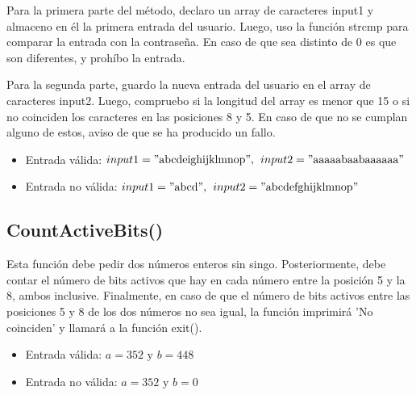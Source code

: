 \documentclass[11pt,a4paper]{article}
\begin{document}
Para la primera parte del método, declaro un array de caracteres input1 y almaceno en él la primera entrada del usuario. Luego, uso la función strcmp para comparar la entrada con la contraseña. En caso de que sea distinto de 0 es que son diferentes, y prohíbo la entrada.

Para la segunda parte, guardo la nueva entrada del usuario en el array de caracteres input2. Luego, compruebo si la longitud del array es menor que 15 o si no coinciden los caracteres en las posiciones 8 y 5. En caso de que no se cumplan alguno de estos, aviso de que se ha producido un fallo.

\begin{itemize}
  \item Entrada válida: \(input1 = \text{''abcdeighijklmnop''}, \hspace{1.5mm} input2 = \text{''aaaaabaabaaaaaa''}\)
  \item Entrada no válida: \(input1 = \text{''abcd''}, \hspace{1.5mm} input2 = \text{''abcdefghijklmnop''}\)
\end{itemize}
\subsection{CountActiveBits()}
Esta función debe pedir dos números enteros sin singo. Posteriormente, debe contar el número de bits activos
que hay en cada número entre la posición 5 y la 8, ambos inclusive. Finalmente, en caso de que el 
número de bits activos entre las posiciones 5 y 8 de los dos números   no sea igual, la función 
imprimirá 'No coinciden' y llamará a la función exit().
\begin{itemize}
  \item Entrada válida: \(a = 352 \text{ y } b = 448\)
  \item Entrada no válida: \(a = 352 \text{ y } b = 0\)
\end{itemize}
\end{document}
